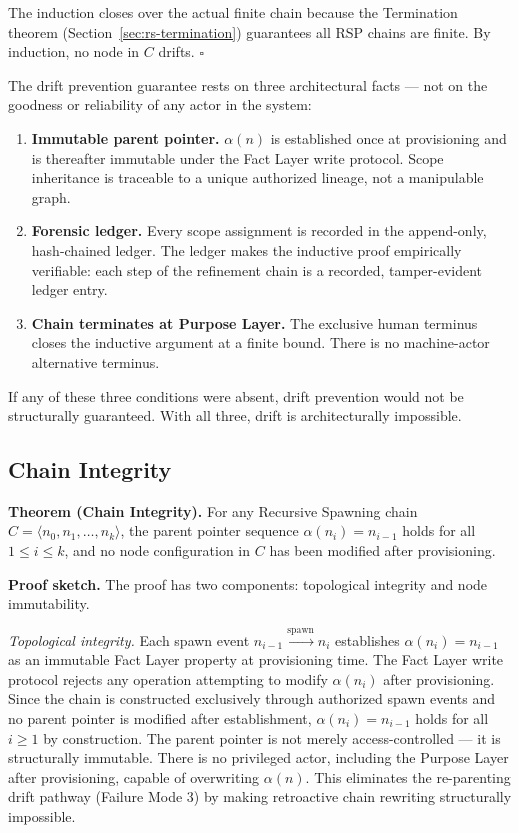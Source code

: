 The induction closes over the actual finite chain because the Termination theorem (Section~\ref{sec:rs-termination}) guarantees all RSP chains are finite. By induction, no node in $C$ drifts. $\square$

\medskip
The drift prevention guarantee rests on three architectural facts — not on the goodness or reliability of any actor in the system:

\begin{enumerate}
    \item[(1)] \textbf{Immutable parent pointer.} $\alpha(n)$ is established once at provisioning and is thereafter immutable under the Fact Layer write protocol. Scope inheritance is traceable to a unique authorized lineage, not a manipulable graph.
    \item[(2)] \textbf{Forensic ledger.} Every scope assignment is recorded in the append-only, hash-chained ledger. The ledger makes the inductive proof empirically verifiable: each step of the refinement chain is a recorded, tamper-evident ledger entry.
    \item[(3)] \textbf{Chain terminates at Purpose Layer.} The exclusive human terminus closes the inductive argument at a finite bound. There is no machine-actor alternative terminus.
\end{enumerate}

If any of these three conditions were absent, drift prevention would not be structurally guaranteed. With all three, drift is architecturally impossible.

\subsection{Chain Integrity}
\label{sec:rs-chain-integrity-proof}

\medskip
\noindent\textbf{Theorem (Chain Integrity).} For any Recursive Spawning chain $C = \langle n_0, n_1, \ldots, n_k \rangle$, the parent pointer sequence $\alpha(n_i) = n_{i-1}$ holds for all $1 \leq i \leq k$, and no node configuration in $C$ has been modified after provisioning.

\medskip
\noindent\textbf{Proof sketch.} The proof has two components: topological integrity and node immutability.

\medskip
\textit{Topological integrity.} Each spawn event $n_{i-1} \xrightarrow{\mathrm{spawn}} n_i$ establishes $\alpha(n_i) = n_{i-1}$ as an immutable Fact Layer property at provisioning time. The Fact Layer write protocol rejects any operation attempting to modify $\alpha(n_i)$ after provisioning. Since the chain is constructed exclusively through authorized spawn events and no parent pointer is modified after establishment, $\alpha(n_i) = n_{i-1}$ holds for all $i \geq 1$ by construction. The parent pointer is not merely access-controlled — it is structurally immutable. There is no privileged actor, including the Purpose Layer after provisioning, capable of overwriting $\alpha(n)$. This eliminates the re-parenting drift pathway (Failure Mode 3) by making retroactive chain rewriting structurally impossible.

